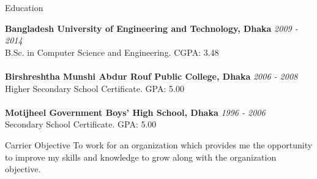 \documentclass{resume} %
\begin{document}

\begin{rSection}{Education}

{\bf Bangladesh University of Engineering and Technology, Dhaka} \hfill {\em 2009 - 2014} 
\\ B.Sc. in Computer Science and Engineering.\hfill { CGPA: 3.48 }
\\
\\{\bf Birshreshtha Munshi Abdur Rouf Public College, Dhaka} \hfill {\em 2006 - 2008} 
\\ Higher Secondary School Certificate.\hfill { GPA: 5.00 }
\\
\\{\bf Motijheel Government Boys'​ High School, Dhaka} \hfill {\em 1996 - 2006} 
\\ Secondary School Certificate.\hfill { GPA: 5.00 }


\end{rSection}

\begin{rSection}{Carrier Objective}
 To work for an organization which provides me the opportunity to improve my skills and knowledge to grow along with the organization objective.
\end{rSection}

\end{document}
